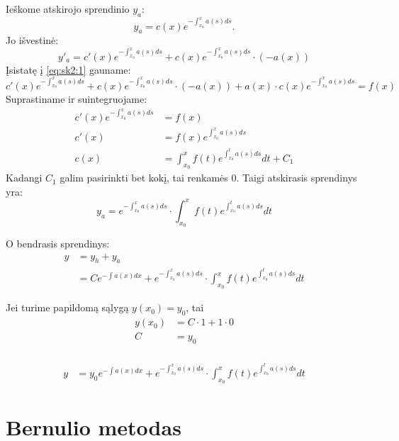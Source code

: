 Ieškome atskirojo sprendinio $y_{a}$:
\begin{equation*}
  y_{a} = c(x) e^{-\int _{x_{0}}^{x} a(s) ds}.
\end{equation*}
Jo išvestinė:
\begin{equation*}
  y'_{a} = c'(x) e^{-\int _{x_{0}}^{x} a(s) ds} +%
    c(x) e^{-\int _{x_{0}}^{x} a(s) ds}\cdot(-a(x))
\end{equation*}
Įsistatę į \ref{eq:sk2:1} gauname:
\begin{equation*}
  c'(x) e^{-\int _{x_{0}}^{x} a(s) ds} +%
    c(x) e^{-\int _{x_{0}}^{x} a(s) ds}\cdot(-a(x)) +%
  a(x) \cdot c(x) e^{-\int _{x_{0}}^{x} a(s) ds} = f(x)
\end{equation*}
Suprastiname ir suintegruojame:
\begin{align*}
  c'(x) e^{-\int _{x_{0}}^{x} a(s) ds} &= f(x) \\
  c'(x) &= f(x) e^{\int _{x_{0}}^{x} a(s) ds} \\
  c(x) &= \int _{x_{0}} ^{x} f(t) e^{\int _{x_{0}}^{t} a(s) ds} dt + C_{1}
\end{align*}
Kadangi $C_{1}$ galim pasirinkti bet kokį, tai renkamės 0. Taigi
atskirasis sprendinys yra:
\begin{equation*}
  y_{a} =
    e^{-\int _{x_{0}}^{x} a(s) ds} \cdot 
    \int _{x_{0}} ^{x} f(t) e^{\int _{x_{0}}^{t} a(s) ds} dt
\end{equation*}

O bendrasis sprendinys:
\begin{align*}
  y
  &= y_{h} + y_{a} \\
  &= C e^{-\int a(x) dx} + 
    e^{-\int _{x_{0}}^{x} a(s) ds} \cdot 
    \int _{x_{0}} ^{x} f(t) e^{\int _{x_{0}}^{t} a(s) ds} dt
\end{align*}

Jei turime papildomą sąlygą $y(x_{0}) = y_{0}$, tai
\begin{align*}
  y(x_{0}) &= C \cdot 1 + 1 \cdot 0 \\
  C &= y_{0} \\
\end{align*}

\begin{align*}
  y
  &= y_{0} e^{-\int a(x) dx} + 
    e^{-\int _{x_{0}}^{x} a(s) ds} \cdot 
    \int _{x_{0}} ^{x} f(t) e^{\int _{x_{0}}^{t} a(s) ds} dt
\end{align*}

\section{Bernulio metodas}

